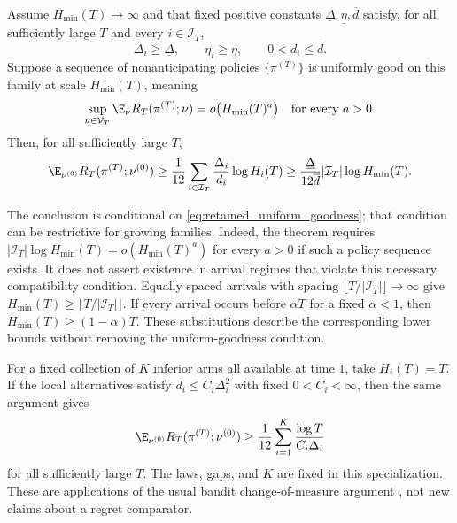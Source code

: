 \begin{theorem}
\label{thm:retained_distractors}
Assume $H_{\min}(T)\to\infty$ and that fixed positive constants
$\underline\Delta,\underline\eta,\overline d$ satisfy, for all sufficiently
large $T$ and every $i\in\mathcal I_T$,
\[
 \Delta_i\ge\underline\Delta,\qquad
 \eta_i\ge\underline\eta,\qquad
 0<d_i\le\overline d.
\]
Suppose a sequence of nonanticipating policies $\{\pi^{(T)}\}$ is uniformly
good on this family at scale $H_{\min}(T)$, meaning
\begin{equation}
 \sup_{\nu\in\mathcal V_T}\E_\nu
       R_T(\pi^{(T)};\nu)=o\bigl(H_{\min}(T)^a\bigr)
       \quad\text{for every }a>0.
 \label{eq:retained_uniform_goodness}
\end{equation}
Then, for all sufficiently large $T$,
\begin{equation}
 \E_{\nu^{(0)}}R_T(\pi^{(T)};\nu^{(0)})
 \ge \frac1{12}\sum_{i\in\mathcal I_T}
                 \frac{\Delta_i}{d_i}\log H_i(T)
 \ge \frac{\underline\Delta}{12\overline d}
            |\mathcal I_T|\log H_{\min}(T).
 \label{eq:retained_distractor_lb}
\end{equation}
\end{theorem}

The conclusion is conditional on \eqref{eq:retained_uniform_goodness}; that
condition can be restrictive for growing families. Indeed, the theorem
requires $|\mathcal I_T|\log H_{\min}(T)=o(H_{\min}(T)^a)$ for every $a>0$
if such a policy sequence exists. It does not assert existence in arrival
regimes that violate this necessary compatibility condition. Equally spaced
arrivals with spacing $\lfloor T/|\mathcal I_T|\rfloor\to\infty$ give
$H_{\min}(T)\ge\lfloor T/|\mathcal I_T|\rfloor$. If every arrival occurs
before $\alpha T$ for a fixed $\alpha<1$, then
$H_{\min}(T)\ge(1-\alpha)T$. These substitutions describe the corresponding
lower bounds without removing the uniform-goodness condition.

For a fixed collection of $K$ inferior arms all available at time $1$, take
$H_i(T)=T$. If the local alternatives satisfy
$d_i\le C_i\Delta_i^2$ with fixed $0<C_i<\infty$, then the same argument gives
\begin{equation}
 \E_{\nu^{(0)}}R_T(\pi^{(T)};\nu^{(0)})
 \ge \frac1{12}\sum_{i=1}^K\frac{\log T}{C_i\Delta_i}
 \label{eq:retained_static_lb}
\end{equation}
for all sufficiently large $T$. The laws, gaps, and $K$ are fixed in this
specialization. These are applications of the usual bandit change-of-measure
argument \citep{kaufmann2016}, not new claims about a regret comparator.
\suppproof

